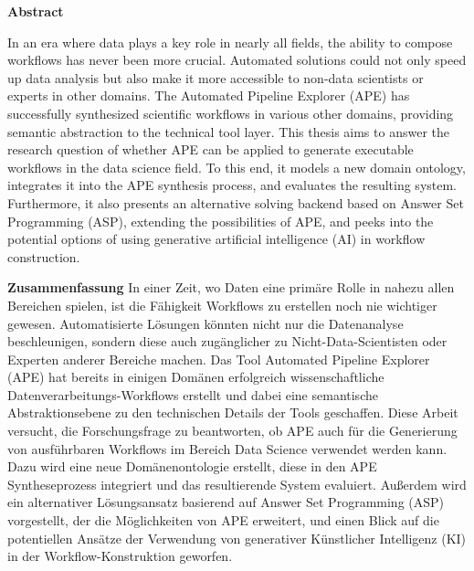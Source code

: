 
\thispagestyle{plain}
\begin{center}
\Large

\vspace{10ex}

\large

\vspace{5ex}
\textbf{Abstract}

\end{center}

In an era where data plays a key role in nearly all fields, the ability to compose workflows has never been more crucial. Automated solutions could not only speed up data analysis but also make it more accessible to non-data scientists or experts in other domains. The Automated Pipeline Explorer (APE) has successfully synthesized scientific workflows in various other domains, providing semantic abstraction to the technical tool layer. This thesis aims to answer the research question of whether APE can be applied to generate executable workflows in the data science field. To this end, it models a new domain ontology, integrates it into the APE synthesis process, and evaluates the resulting system. Furthermore, it also presents an alternative solving backend based on Answer Set Programming (ASP), extending the possibilities of APE, and peeks into the potential options of using generative artificial intelligence (AI) in workflow construction.

\vspace{5ex}

\begin{center}
\large \textbf{Zusammenfassung}
In einer Zeit, wo Daten eine primäre Rolle in nahezu allen Bereichen spielen, ist die Fähigkeit Workflows zu erstellen noch nie wichtiger gewesen. Automatisierte Lösungen könnten nicht nur die Datenanalyse beschleunigen, sondern diese auch zugänglicher zu Nicht-Data-Scientisten oder Experten anderer Bereiche machen. Das Tool Automated Pipeline Explorer (APE) hat bereits in einigen Domänen erfolgreich wissenschaftliche Datenverarbeitungs-Workflows erstellt und dabei eine semantische Abstraktionsebene zu den technischen Details der Tools geschaffen. Diese Arbeit versucht, die Forschungsfrage zu beantworten, ob APE auch für die Generierung von ausführbaren Workflows im Bereich Data Science verwendet werden kann. Dazu wird eine neue Domänenontologie erstellt, diese in den APE Syntheseprozess integriert und das resultierende System evaluiert. Außerdem wird ein alternativer Lösungsansatz basierend auf Answer Set Programming (ASP) vorgestellt, der die Möglichkeiten von APE erweitert, und einen Blick auf die potentiellen Ansätze der Verwendung von generativer Künstlicher Intelligenz (KI) in der Workflow-Konstruktion geworfen.
\end{center}
